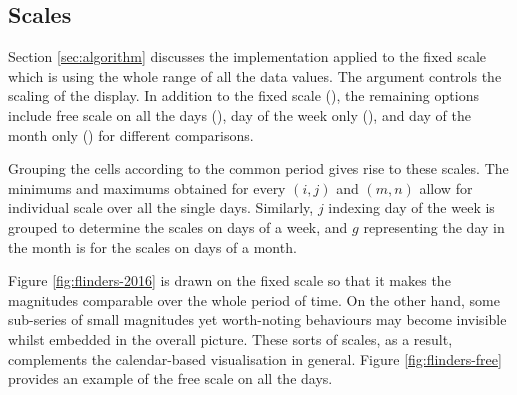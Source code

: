 \documentclass[article]{jss}
\begin{document}
\subsection{Scales}\label{scales}

Section \ref{sec:algorithm} discusses the implementation applied to the
fixed scale which is using the whole range of all the data values. The
 argument controls the scaling of the display. In addition
to the fixed scale (), the remaining options include free
scale on all the days (), day of the week only
(), and day of the month only () for
different comparisons.

Grouping the cells according to the common period gives rise to these
scales. The minimums and maximums obtained for every \((i, j)\) and
\((m, n)\) allow for individual scale over all the single days.
Similarly, \(j\) indexing day of the week is grouped to determine the
scales on days of a week, and \(g\) representing the day in the month is
for the scales on days of a month.

Figure \ref{fig:flinders-2016} is drawn on the fixed scale so that it
makes the magnitudes comparable over the whole period of time. On the
other hand, some sub-series of small magnitudes yet worth-noting
behaviours may become invisible whilst embedded in the overall picture.
These sorts of scales, as a result, complements the calendar-based
visualisation in general. Figure \ref{fig:flinders-free} provides an
example of the free scale on all the days.
\end{document}
